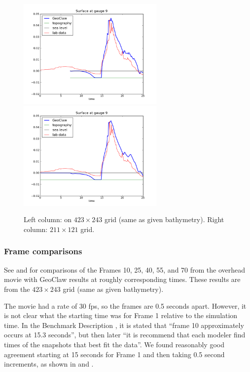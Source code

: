 \begin{figure}[ht]
\vskip 5pt
\hfil\includegraphics[width=2.8in]{bp7/figs423/gauge0009fig300.png}\hfil
\hfil\includegraphics[width=2.8in]{bp7/figs211/gauge0009fig300.png}\hfil
\caption{\label{fig:bp7gauges} 
Left column: on $423\times 243$ grid (same as given bathymetry).
Right column: $211\times 121$ grid.
  }
\end{figure}



\subsubsection{Frame comparisons}

See  and  for comparisons of the Frames 10,
25, 40, 55, and 70 from the overhead movie with GeoClaw results at roughly
corresponding times.  These results are from the $423\times 243$ grid (same
as given bathymetry).

The movie had a rate of 30 fps, so the frames are 0.5 seconds apart. However,
it is not clear what the starting time was for Frame 1 relative to the
simulation time.   In the Benchmark Description \cite{bp-description}, it is
stated that ``frame 10 approximately occurs at 15.3 seconds'', but then later
``it is recommend that each modeler find times of the snapshots that best fit
the data''.   We found reasonably good agreement starting at 15 seconds for
Frame 1 and then taking 0.5 second increments, as shown in 
and .

